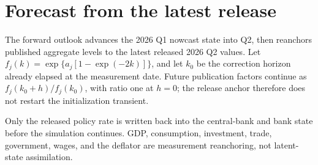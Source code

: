 \documentclass[10pt]{article}
\begin{document}
\clearpage
\section{Forecast from the latest release}

The forward outlook advances the 2026 Q1 nowcast state into Q2, then reanchors
published aggregate levels to the latest released 2026 Q2 values. Let
\(f_j(k)=\exp\{a_j[1-\exp(-2k)]\}\), and let \(k_0\) be the correction horizon
already elapsed at the measurement date. Future publication factors continue
as \(f_j(k_0+h)/f_j(k_0)\), with ratio one at \(h=0\); the release anchor
therefore does not restart the initialization transient.

Only the released policy rate is written back into the central-bank and bank
state before the simulation continues. GDP, consumption, investment, trade,
government, wages, and the deflator are measurement reanchoring, not
latent-state assimilation.
\end{document}

